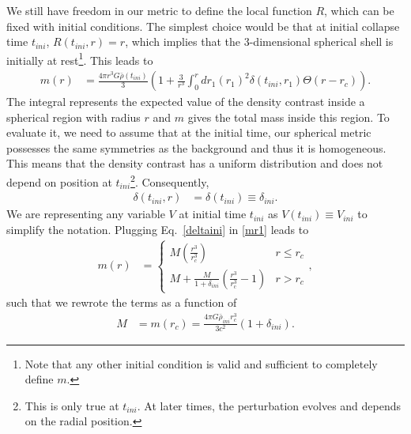 \documentclass[a4paper,11pt]{article}
\begin{document}
We still have freedom in our metric to define the local function $R$, which can be fixed
with initial conditions. The simplest choice would be that at initial collapse time
$t_{ini}$, $R(t_{ini},r) = r$, which implies that the 3-dimensional spherical shell is
initially at rest\footnote{Note that any other initial condition is valid and sufficient
	to completely define $m$.}. This leads to
\begin{align}
	\label{mr1}
	m(r) & = \frac{4\pi r^3G \bar{\rho}(t_{ini})}{3}\left(1 + \frac{3}{r^3}\int_0^r dr_1 (r_1)^2\delta(t_{ini}, r_1)\Theta(r-r_c)\right)
	.\end{align}
The integral represents the expected value of the density contrast inside a spherical region with radius $r$ and $m$ gives the total mass inside this region. To evaluate it, we need to assume that at the initial time, our spherical metric possesses the same symmetries as the background and thus it is homogeneous. This means that the density contrast has a uniform distribution and does not depend on position at $t_{ini}$\footnote{This is only true at $t_{ini}$. At later times, the perturbation evolves and depends on the radial position.}. Consequently,
\begin{align}
	\label{deltaini}
	\delta(t_{ini}, r) & = \delta(t_{ini}) \equiv  \delta_{ini}.
\end{align}
We are representing any variable $V$ at initial time $t_{ini}$ as $V(t_{ini})\equiv V_{ini}$ to simplify the notation. Plugging Eq.~\eqref{deltaini} in \eqref{mr1} leads to
\begin{align}
	\label{pbhmassmetric}
	m (r) & =  \left\{\begin{array}{ll}
		                  M\left(\frac{r^3}{r_c^3}\right)                                       & r \leq r_c \\
		                  M+\frac{M}{1+\delta_{ini}}\left(\frac{r^3}{r_{\mathrm{c}}^3}-1\right) & r > r_c
	                  \end{array}\right.,
\end{align}
such that we rewrote the terms as a function of
\begin{align}
	M & =m(r_c)=\frac{4\pi G \bar{\rho}_{ini}r^3_c}{3c^2}\left(1 + \delta_{ini}\right)
	.\end{align}
\end{document}
